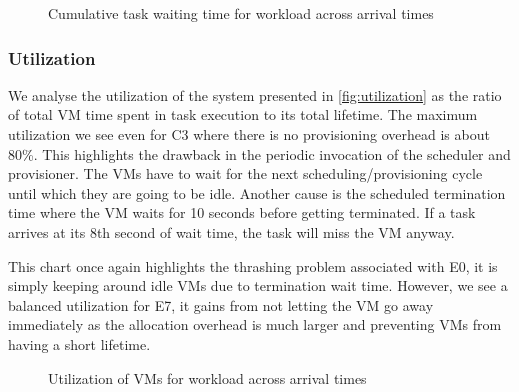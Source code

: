 \documentclass[a4paper]{IEEEtran}
\begin{document}
\begin{figure}[tbp]
  \caption{Cumulative task waiting time for workload across arrival times}
  \label{fig:waiting_time}
\end{figure}

\subsubsection{Utilization}

We analyse the utilization of the system presented in \autoref{fig:utilization} as the ratio of total VM time spent
in task execution to its total lifetime. The maximum utilization we see even for \textsc{C3} where there is no provisioning overhead is about 80\%. This highlights the drawback in the periodic invocation of the scheduler and provisioner. The VMs have to wait for the next scheduling/provisioning cycle until which they are going to be idle. Another cause is the scheduled termination time where the VM waits for 10 seconds before getting terminated. If a task arrives at its 8th second of wait time, the task will miss the VM anyway. 

This chart once again highlights the thrashing problem associated with \textsc{E0}, it is simply keeping around idle VMs due to termination wait time. However, we see a balanced utilization for \textsc{E7}, it gains from not letting the VM go away immediately as the allocation overhead is much larger and preventing VMs from having a short lifetime.

\begin{figure}[tbp]
  \caption{Utilization of VMs for workload across arrival times}
  \label{fig:utilization}
\end{figure}
\end{document}
